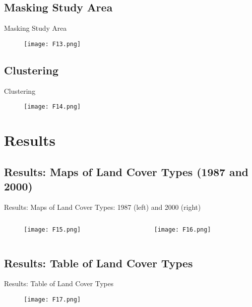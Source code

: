 \documentclass[pdflatex,compress,9pt,
	xcolor={dvipsnames,dvipsnames,svgnames,x11names,table},
	hyperref={colorlinks = true,breaklinks = true, urlcolor = NavyBlue, breaklinks = true}]{beamer}
\begin{document}
\subsection{Masking Study Area}
\begin{frame}{Masking Study Area}
\begin{figure}[H]
	\centering
		\texttt{[image: F13.png]}
\end{figure}
\end{frame}

\subsection{Clustering}
\begin{frame}{Clustering}
\begin{figure}[H]
	\centering
		\texttt{[image: F14.png]}
\end{figure}
\end{frame}

\section{Results}
\subsection{Results: Maps of Land Cover Types (1987 and 2000)}
\begin{frame}{Results: Maps of Land Cover Types: 1987 (left) and 2000 (right)}
\begin{minipage}[0.4\textheight]{\textwidth}
\begin{columns}[T]
\begin{column}{0.5\textwidth}
\begin{figure}[H]
	\centering
		\texttt{[image: F15.png]}
\end{figure}
\end{column}
\begin{column}{0.5\textwidth}
\begin{figure}[H]
	\centering
		\texttt{[image: F16.png]}
\end{figure}
\end{column}
\end{columns}
\end{minipage}
\end{frame}

\subsection{Results: Table of Land Cover Types}
\begin{frame}{Results: Table of Land Cover Types}
\begin{figure}[H]
	\centering
		\texttt{[image: F17.png]}
\end{figure}
\end{frame}
\end{document}
